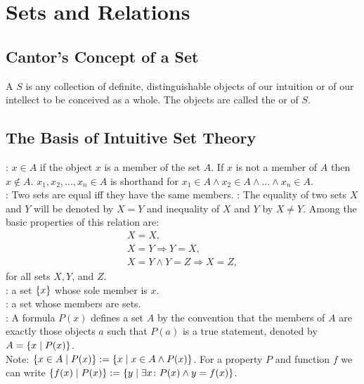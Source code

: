 \documentclass[12pt]{book}
\begin{document}
\chapter{Sets and Relations}

\section{Cantor's Concept of a Set}
A  $S$ is any collection of definite, distinguishable objects of our intuition or of our intellect to be conceived as a whole. The objects are called the  or  of $S$.

\section{The Basis of Intuitive Set Theory}
: $x \in A$ if the object $x$ is a member of the set $A$. If $x$ is not a member of $A$ then $x \notin A$. $x_1, x_2, \dots, x_n \in A$ is shorthand for $x_1 \in A \wedge x_2 \in A \wedge \dots \wedge x_n \in A$.\\
: Two sets are equal iff they have the same members.
: The equality of two sets $X$ and $Y$ will be denoted by $X = Y$ and inequality of $X$ and $Y$ by $X \neq Y$. Among the basic properties of this relation are:
\begin{gather*}
X = X,\\X = Y \Rightarrow Y = X,\\ X = Y \wedge Y = Z \Rightarrow X = Z,
\end{gather*}
for all sets $X, Y$, and $Z$.\\
: a set $\{x\}$ whose sole member is $x$.\\
: a set whose members are sets.\\
: A formula $P(x)$ defines a set $A$ by the convention that the members of $A$ are exactly those objects $a$ such that $P(a)$ is a true statement, denoted by $A = \{x \mid P(x)\}$.\\
Note: $\{x \in A \mid P(x)\} := \{x \mid x \in A \wedge P(x)\}$. For a property $P$ and function $f$ we can write $\{f(x)\mid P(x)\} := \{y \mid \exists x\colon P(x) \wedge y = f(x)\}$.
\end{document}
